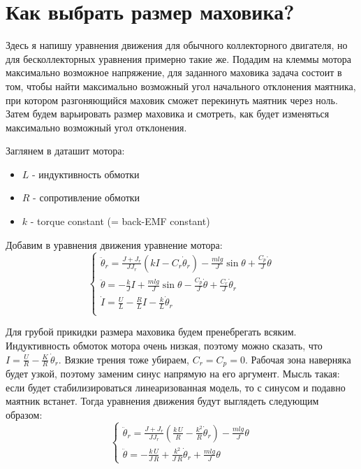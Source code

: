 \documentclass{article}
\begin{document}
\section{Как выбрать размер маховика?}

Здесь я напишу уравнения движения для обычного коллекторного двигателя, но для бесколлекторных уравнения примерно такие же.  Подадим на клеммы мотора максимально возможное напряжение, для заданного маховика задача состоит в том, чтобы найти максимально возможный угол начального отклонения маятника, при котором разгоняющийся маховик сможет перекинуть маятник через ноль. Затем будем варьировать размер маховика и смотреть, как будет изменяться максимально возможный угол отклонения.

Заглянем в даташит мотора:
\begin{itemize}
    \item $L$ - индуктивность обмотки
    \item $R$ - сопротивление обмотки
    \item $k$ - torque constant (= back-EMF constant)
\end{itemize}

Добавим в уравнения движения уравнение мотора:
$$
\left\{
\begin{array}{l}
\ddot\theta_r = \frac{J+J_r}{J J_r}(kI - C_r\dot\theta_r)  -\frac{mlg}{J}\sin\theta + \frac{C_p}{J}\dot\theta\\
\ddot \theta  = -\frac{k}{J} I + \frac{mlg}{J}\sin\theta - \frac{C_p}{J} \dot\theta + \frac{C_r}{J} \dot\theta_r\\
\dot I  = \frac{U}{L} - \frac{R}{L}I - \frac{k}{L} \dot\theta_r\\
\end{array}
\right.
$$

Для грубой прикидки размера маховика будем пренебрегать всяким. Индуктивность обмоток мотора очень низкая, поэтому можно сказать, что $I=\frac{U}{R}-\frac{K}{R}\,\dot\theta_r$. Вязкие трения тоже убираем, $C_r=C_p=0$. 
Рабочая зона наверняка будет узкой, поэтому заменим синус напрямую на его аргумент. Мысль такая: если будет стабилизироваться линеаризованная модель, то с синусом и подавно маятник встанет. Тогда уравнения движения будут выглядеть следующим образом:
$$
\left\{
\begin{array}{l}
\ddot\theta_r = \frac{J+J_r}{J J_r}(\frac{k\,U}{R} - \frac{k^2}{R}\dot\theta_r)  - \frac{mlg}{J}\theta\\
\ddot \theta  = -\frac{k\,U}{J\,R} + \frac{k^2}{J\,R}\dot\theta_r + \frac{mlg}{J}\theta
\end{array}
\right.
$$
\end{document}
